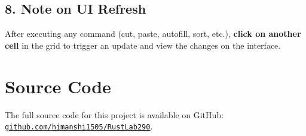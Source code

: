 \documentclass{article}
\begin{document}
\subsection*{8. Note on UI Refresh}
After executing any command (cut, paste, autofill, sort, etc.), \textbf{click on another cell} in the grid to trigger an update and view the changes on the interface.

\section*{Source Code}
The full source code for this project is available on GitHub:
\href{https://github.com/himanshi1505/RustLab290}{\texttt{github.com/himanshi1505/RustLab290}}.
\end{document}
